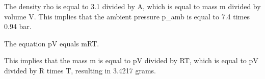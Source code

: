The density rho is equal to 3.1 divided by A, which is equal to mass m divided by volume V. This implies that the ambient pressure p_amb is equal to 7.4 times 0.94 bar.

The equation pV equals mRT.

This implies that the mass m is equal to pV divided by RT, which is equal to pV divided by R times T, resulting in 3.4217 grams.